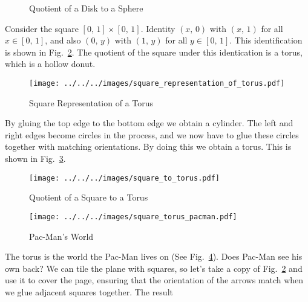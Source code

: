 \documentclass{article}
\theoremstyle{plain}
\theoremstyle{normal}
\begin{document}
        \begin{figure}
            \centering
            \caption{Quotient of a Disk to a Sphere}
            \label{fig:quotient_disk_to_sphere}
        \end{figure}
        Consider the square $[0,\,1]\times[0,\,1]$. Identity
        $(x,\,0)$ with $(x,\,1)$ for all $x\in[0,\,1]$, and also
        $(0,\,y)$ with $(1,\,y)$ for all $y\in[0,\,1]$. This identification
        is shown in Fig.~\ref{fig:square_representation_of_torus}. The quotient
        of the square under this identication is a torus, which is a hollow
        donut.
        \begin{figure}
            \centering
            \texttt{[image: ../../../images/square\_representation\_of\_torus.pdf]}
            \caption{Square Representation of a Torus}
            \label{fig:square_representation_of_torus}
        \end{figure}
        \par\hfill\par
        By gluing the top edge to the bottom edge we obtain a cylinder. The
        left and right edges become circles in the process, and we now have to
        glue these circles together with matching orientations. By doing this
        we obtain a torus. This is shown in
        Fig.~\ref{fig:square_to_torus}.
        \begin{figure}
            \centering
            \texttt{[image: ../../../images/square\_to\_torus.pdf]}
            \caption{Quotient of a Square to a Torus}
            \label{fig:square_to_torus}
        \end{figure}
        \begin{figure}
            \centering
            \texttt{[image: ../../../images/square\_torus\_pacman.pdf]}
            \caption{Pac-Man's World}
            \label{fig:square_torus_pacman}
        \end{figure}
        \par\hfill\par
        The torus is the world the Pac-Man lives on
        (See Fig.~\ref{fig:square_torus_pacman}).
        Does Pac-Man see his own back? We can tile the plane with squares, so
        let's take a copy of Fig.~\ref{fig:square_representation_of_torus}
        and use it to cover the page, ensuring that the orientation of the
        arrows match when we glue adjacent squares together. The result
\end{document}
